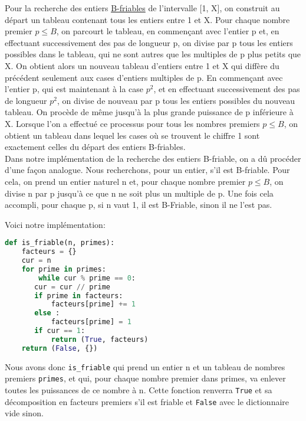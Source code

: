 Pour la recherche des entiers \hyperref[friable]{B-friables} de l'intervalle [1, X], on construit au départ un tableau contenant tous les entiers entre 1 et X. 
Pour chaque nombre premier $p \leq B$, on parcourt le tableau, en commençant avec l’entier p et, en effectuant successivement des pas de longueur p, on divise par p tous les entiers possibles dans le tableau, qui ne sont autres que les multiples de p plus petits que X. 
On obtient alors un nouveau tableau d’entiers entre 1 et X qui diffère du précédent seulement aux cases d’entiers multiples de p. 
En commençant avec l’entier p, qui est maintenant à la case $p^2$, et en effectuant successivement des pas de longueur $p^2$, on divise de nouveau par p tous les entiers possibles du nouveau tableau. 
On procède de même jusqu’à la plus grande puissance de p inférieure à X. 
Lorsque l’on a effectué ce processus pour tous les nombres premiers $p \leq B$, on obtient un tableau dans lequel les cases où se trouvent le chiffre 1 sont exactement celles du départ des entiers B-friables.\\

Dans notre implémentation de la recherche des entiers B-friable, on a dû procéder d'une façon analogue. Nous recherchons, pour un entier, s'il est B-friable.
Pour cela, on prend un entier naturel n et, pour chaque nombre premier $p \leq B$, on divise n par p jusqu'à ce que n ne soit plus un multiple de p. Une fois cela accompli, pour chaque p, si n vaut 1, il est B-Friable, sinon il ne l'est pas.

Voici notre implémentation:
\begin{lstlisting}[language=Python]
def is_friable(n, primes): 
    facteurs = {}
    cur = n
    for prime in primes:
        while cur % prime == 0:
	   cur = cur // prime
	   if prime in facteurs:
	       facteurs[prime] += 1
	   else :
	       facteurs[prime] = 1
	   if cur == 1:
	       return (True, facteurs)
    return (False, {})
\end{lstlisting}
\vspace{1em}

Nous avons donc \lstinline{is_friable} qui prend un entier n et un tableau de nombres premiers \lstinline{primes}, et qui, pour chaque nombre premier dans primes, va enlever toutes les puissances de ce nombre à n.
Cette fonction renverra \lstinline{True} et sa décomposition en facteurs premiers s'il est friable et \lstinline{False} avec le dictionnaire vide sinon.

